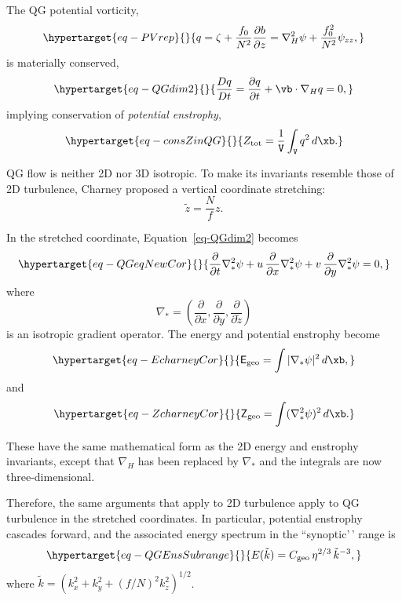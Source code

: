 \documentclass[
  letterpaper,
  twocolumn,
  landscape]{report}
\begin{document}
The QG potential vorticity,
\begin{equation}\protect\hypertarget{eq-PVrep}{}{
q = \zeta + \frac{f_0}{N^2} \frac{\partial b}{\partial z}
= \nabla_H^2\psi + \frac{f_0^2}{N^2}\psi_{zz},
}\label{eq-PVrep}\end{equation} is materially conserved,
\begin{equation}\protect\hypertarget{eq-QGdim2}{}{
\frac{Dq}{Dt} = \frac{\partial q}{\partial t} + \vb\cdot\nabla_H q = 0,
}\label{eq-QGdim2}\end{equation} implying conservation of
\emph{potential enstrophy},
\begin{equation}\protect\hypertarget{eq-consZinQG}{}{
Z_{\text{tot}} = \frac{1}{\mathtt{V}}\int_{\mathtt{V}} q^2\, d\xb.
}\label{eq-consZinQG}\end{equation}

QG flow is neither 2D nor 3D isotropic. To make its invariants resemble
those of 2D turbulence, Charney proposed a vertical coordinate
stretching: \[
\tilde{z} = \frac{N}{f} z.
\]

In the stretched coordinate, Equation~\ref{eq-QGdim2} becomes
\begin{equation}\protect\hypertarget{eq-QGeqNewCor}{}{
\frac{\partial}{\partial t}\nabla^2_\ast\psi
+ u\,\frac{\partial}{\partial x}\nabla^2_\ast\psi
+ v\,\frac{\partial}{\partial y}\nabla^2_\ast\psi = 0,
}\label{eq-QGeqNewCor}\end{equation} where \[
\nabla_\ast = \left(\frac{\partial}{\partial x},
                 \frac{\partial}{\partial y},
                 \frac{\partial}{\partial \tilde{z}}\right)
\] is an isotropic gradient operator. The energy and potential enstrophy
become \begin{equation}\protect\hypertarget{eq-EcharneyCor}{}{
\mathsf{E}_{\text{geo}} = \int |\nabla_\ast\psi|^2\, d\xb,
}\label{eq-EcharneyCor}\end{equation} and
\begin{equation}\protect\hypertarget{eq-ZcharneyCor}{}{
\mathsf{Z}_{\text{geo}} = \int (\nabla_\ast^2\psi)^2\, d\xb.
}\label{eq-ZcharneyCor}\end{equation}

These have the same mathematical form as the 2D energy and enstrophy
invariants, except that \(\nabla_H\) has been replaced by
\(\nabla_\ast\) and the integrals are now three-dimensional.

Therefore, the same arguments that apply to 2D turbulence apply to QG
turbulence in the stretched coordinates. In particular, potential
enstrophy cascades forward, and the associated energy spectrum in the
``synoptic'\,' range is
\begin{equation}\protect\hypertarget{eq-QGEnsSubrange}{}{
E(\tilde{k}) = C_{\text{geo}}\,\eta^{2/3}\,\tilde{k}^{-3},
}\label{eq-QGEnsSubrange}\end{equation} where
\(\tilde{k} = (k_x^2 + k_y^2 + (f/N)^2 k_z^2)^{1/2}\).
\end{document}
